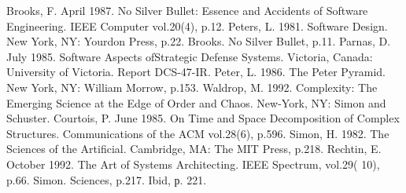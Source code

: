 \documentclass[10pt]{article}
\begin{document}
\begin{thebibliography}{0}
 Brooks, F. April 1987. No Silver Bullet: Essence and Accidents of Software Engineering. IEEE Computer vol.20(4), p.12. 
 Peters, L. 1981. Software Design. New York, NY: Yourdon Press, p.22. 
 Brooks. No Silver Bullet, p.11. 
 Parnas, D. July 1985. Software Aspects ofStrategic Defense Systems. Victoria, Canada: University of Victoria. Report DCS-47-IR. 
 Peter, L. 1986. The Peter Pyramid. New York, NY: William Morrow, p.153. 
 Waldrop, M. 1992. Complexity: The Emerging Science at the Edge of Order and Chaos. New-York, NY: Simon and Schuster. 
 Courtois, P. June 1985. On Time and Space Decomposition of Complex Structures. Communications of the ACM vol.28(6), p.596. 
 Simon, H. 1982. The Sciences of the Artificial. Cambridge, MA: The MIT Press, p.218. 
 Rechtin, E. October 1992. The Art of Systems Architecting. IEEE Spectrum, vol.29( 10), p.66. 
 Simon. Sciences, p.217. 
 Ibid, р. 221. 
\end{thebibliography}
\end{document}
